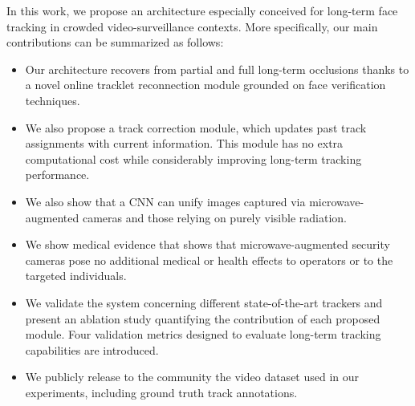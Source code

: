 In this work, we propose an architecture especially conceived for long-term face tracking in crowded video-surveillance contexts. More specifically, our main contributions can be summarized as follows:

\begin{itemize}
    \item Our architecture recovers from partial and full long-term occlusions thanks to a novel online tracklet reconnection module grounded on face verification techniques.
    \item We also propose a track correction module, which updates past track assignments with current information. This module has no extra computational cost while considerably improving long-term tracking performance.
    \item We also show that a CNN can unify images captured via microwave-augmented cameras and those relying on purely visible radiation.
    \item We show medical evidence that shows that microwave-augmented security cameras pose no additional medical or health effects to operators or to the targeted individuals. 
    \item We validate the system concerning different state-of-the-art trackers and present an ablation study quantifying the contribution of each proposed module. Four validation metrics designed to evaluate long-term tracking capabilities are introduced.
    \item We publicly release to the community the video dataset used in our experiments, including ground truth track annotations.
\end{itemize}

